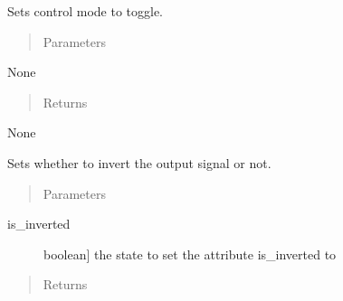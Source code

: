 \documentclass[letterpaper,10pt,english]{sphinxmanual}
\begin{document}
\begin{fulllineitems}

\begin{fulllineitems}
\label{\detokenize{specific:EarOutput.EarOutput.set_control_toggle}}
\sphinxAtStartPar
Sets control mode to toggle.
\begin{quote}\begin{description}
\item[{Parameters}] \leavevmode
\end{description}\end{quote}

\sphinxAtStartPar
None
\begin{quote}\begin{description}
\item[{Returns}] \leavevmode
\end{description}\end{quote}

\sphinxAtStartPar
None

\end{fulllineitems}


\begin{fulllineitems}
\label{\detokenize{specific:EarOutput.EarOutput.set_inversion}}
\sphinxAtStartPar
Sets whether to invert the output signal or not.
\begin{quote}\begin{description}
\item[{Parameters}] \leavevmode
\end{description}\end{quote}
\begin{description}
\item[{is\_inverted}] \leavevmode{[}boolean{]}
\sphinxAtStartPar
the state to set the attribute is\_inverted to

\end{description}
\begin{quote}\begin{description}
\item[{Returns}] \leavevmode
\end{description}\end{quote}


\end{fulllineitems}
\end{fulllineitems}
\end{document}
